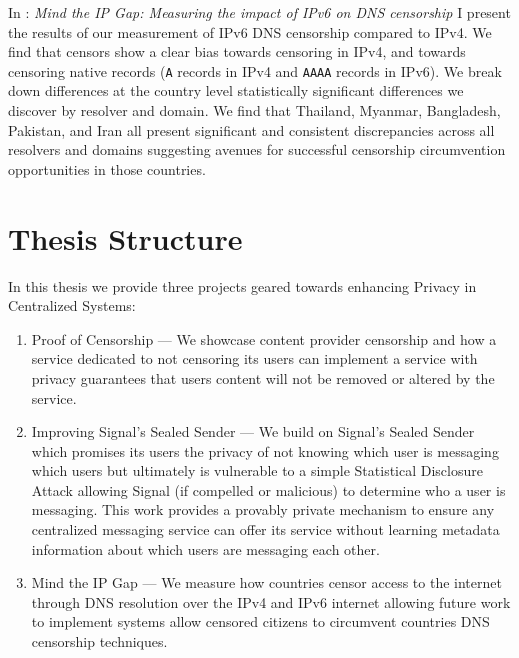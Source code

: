 In : \emph{Mind the IP Gap: Measuring the impact of IPv6 on DNS
censorship} I present the results of our measurement of IPv6 DNS censorship
compared to IPv4. We find that censors show a clear bias towards censoring in
IPv4, and towards censoring native records (\texttt{A} records in IPv4 and
\texttt{AAAA} records in IPv6). We break down differences at the country level
statistically significant differences we discover by resolver and domain. We
find that Thailand, Myanmar, Bangladesh, Pakistan, and Iran all present
significant and consistent discrepancies across all resolvers and domains
suggesting avenues for successful censorship circumvention opportunities in
those countries.

\section{Thesis Structure}
In this thesis we provide three projects geared towards enhancing Privacy in
Centralized Systems:

\begin{enumerate}
    \item Proof of Censorship --- We showcase content provider censorship and
    how a service dedicated to not censoring its users can implement a service
    with privacy guarantees that users content will not be removed or altered by
    the service.
    \item Improving Signal's Sealed Sender --- We build on Signal's Sealed
    Sender which promises its users the privacy of not knowing which user is
    messaging which users but ultimately is vulnerable to a simple Statistical
    Disclosure Attack allowing Signal (if compelled or malicious) to determine
    who a user is messaging. This work provides a provably private mechanism to
    ensure any centralized messaging service can offer its service without
    learning metadata information about which users are messaging each other.
    \item Mind the IP Gap --- We measure how countries censor access to the
    internet through DNS resolution over the IPv4 and IPv6 internet allowing
    future work to implement systems allow censored citizens to circumvent
    countries DNS censorship techniques.
\end{enumerate}
